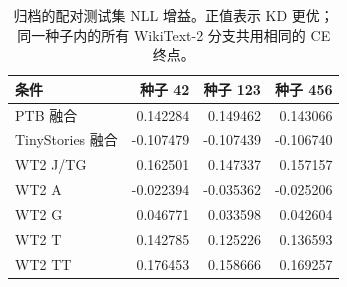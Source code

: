 \begin{table}[!t]\centering
\begin{tabular}{lrrr}
\toprule
条件 & 种子 42 & 种子 123 & 种子 456 \\
\midrule
PTB 融合 & 0.142284 & 0.149462 & 0.143066 \\
TinyStories 融合 & -0.107479 & -0.107439 & -0.106740 \\
WT2 J/TG & 0.162501 & 0.147337 & 0.157157 \\
WT2 A & -0.022394 & -0.035362 & -0.025206 \\
WT2 G & 0.046771 & 0.033598 & 0.042604 \\
WT2 T & 0.142785 & 0.125226 & 0.136593 \\
WT2 TT & 0.176453 & 0.158666 & 0.169257 \\
\bottomrule
\end{tabular}
\caption{归档的配对测试集 NLL 增益。正值表示 KD 更优；同一种子内的所有 WikiText-2 分支共用相同的 CE 终点。}\label{tab:per_seed_gains}
\end{table}
